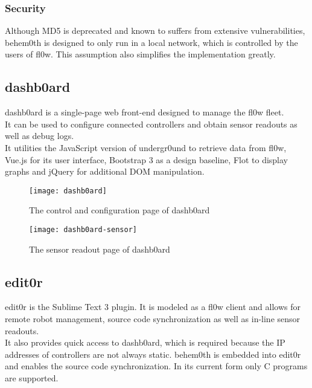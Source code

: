 \documentclass[conference]{IEEEtran}
\begin{document}
\subsubsection{Security}
Although MD5 is deprecated and known to suffers from extensive vulnerabilities, behem0th\cite{behem0th:Christoph Heiss} is designed to only run in a local network, which is controlled by the users of fl0w\cite{fl0w:Philip Trauner}. This assumption also simplifies the implementation greatly.


\subsection{dashb0ard}
dashb0ard\cite{dashb0ard:Sebastian Schaffler} is a single-page web front-end designed to manage the fl0w\cite{fl0w:Philip Trauner} fleet.\\ It can be used to configure connected controllers and obtain sensor readouts as well as debug logs. \\It utilities the JavaScript version of undergr0und to retrieve data from fl0w\cite{fl0w:Philip Trauner}, Vue.js\cite{Vue:Evan You} for its user interface, Bootstrap 3\cite{Bootstrap 3:Twitter Inc.} as a design baseline, Flot\cite{Flot:David Schnur} to display graphs and jQuery\cite{jQuery:jQuery Foundation} for additional DOM manipulation.

\begin{figure}[H]
\centering
\texttt{[image: dashb0ard]}
\caption{The control and configuration page of dashb0ard\cite{Sublime Text 3:Sublime HQ}}
\label{fig:dashb0ard_config}
\end{figure}

\begin{figure}[H]
\centering
\texttt{[image: dashb0ard-sensor]}
\caption{The sensor readout page of dashb0ard\cite{Sublime Text 3:Sublime HQ}}
\label{fig:dashb0ard_sensor}
\end{figure}
\subsection{edit0r}
edit0r\cite{edit0r:Philip Trauner} is the Sublime Text 3\cite{Sublime Text 3:Sublime HQ} plugin. It is modeled as a fl0w\cite{fl0w:Philip Trauner} client and allows for remote robot management, source code synchronization as well as in-line sensor readouts. \\It also provides quick access to dashb0ard\cite{dashb0ard:Sebastian Schaffler}, which is required because the IP addresses of controllers are not always static. behem0th\cite{behem0th:Christoph Heiss} is embedded into edit0r\cite{edit0r:Philip Trauner} and enables the source code synchronization. In its current form only C programs are supported.\\
\end{document}
